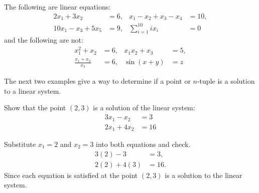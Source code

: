 \begin{example}
The following are linear equations:
%
\begin{align*}
2x_1 + 3x_2 & = 6, & x_1 -x_2+x_3-x_4 & = 10, \\
 10x_1 - x_3 + 5x_5 & = 9,  & \sum_{i=1}^{10} i x_i & = 0 
\end{align*}
and the following are not:
%
\begin{align*}
x_1^2+x_2 & = 6, & x_1x_2 + x_3 & = 5, \\
\frac{x_1+x_2}{x_3} & = 6, & \sin(x+y) &= z 
\end{align*}
\end{example}

The next two examples give a way to determine if a point or $n$-tuple is a solution to a linear system.  

\vspace{1in}

\begin{example}
Show that the point $(2,3)$ is a solution of  the linear system:
%
\begin{align*}
3x_1 - x_2 & = 3 \\
2x_1 + 4x_2 & = 16
\end{align*}

\solution

Substitute $x_1=2$ and $x_2=3$ into both equations and check. 
\begin{align*}
3(2) - 3 & = 3, \\
2(2) + 4(3) & = 16. 
\end{align*}
Since each equation is satisfied at the point $(2,3)$ is a solution to the linear system.  

\end{example}

\phantom{Here's some text}



\phantom{Here's some text}

